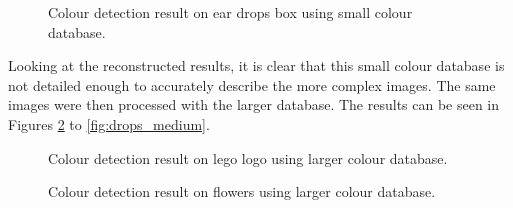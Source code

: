 \documentclass[a4paper,11pt]{article}
\begin{document}
\begin{figure}[H]
\centering
{}
\caption{Colour detection result on ear drops box using small colour database.}
\label{fig:drops_small}
\end{figure}

Looking at the reconstructed results, it is clear that this small colour database is not detailed enough to accurately describe the more complex images. The same images were then processed with the larger database. The results can be seen in Figures \ref{fig:lego_medium} to \ref{fig:drops_medium}.

\begin{figure}[H]
\centering
{}
\caption{Colour detection result on lego logo using larger colour database.}
\label{fig:lego_medium}
\end{figure}

\begin{figure}[H]
\centering
{}
\caption{Colour detection result on flowers using larger colour database.}
\label{fig:flowers_medium}
\end{figure}
\end{document}
